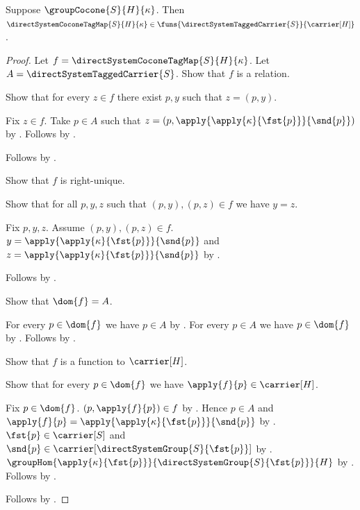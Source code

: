 \begin{theorem}\label{direct_system_cocone_tag_map_type}
    Suppose $\groupCocone{S}{H}{\kappa}$.
    Then $\directSystemCoconeTagMap{S}{H}{\kappa}\in
        \funs{\directSystemTaggedCarrier{S}}{\carrier[H]}$.
\end{theorem}
\begin{proof}
    Let $f=\directSystemCoconeTagMap{S}{H}{\kappa}$.
    Let $A=\directSystemTaggedCarrier{S}$.
    Show that $f$ is a relation.
    \begin{subproof}
        Show that for every $z\in f$ there exist $p,y$ such that
            $z=(p,y)$.
        \begin{subproof}
            Fix $z\in f$.
            Take $p\in A$ such that
                $z=(p,\apply{\apply{\kappa}{\fst{p}}}{\snd{p}})$ by
                .
            Follows by \auto.
        \end{subproof}
        Follows by .
    \end{subproof}
    Show that $f$ is right-unique.
    \begin{subproof}
        Show that for all $p,y,z$ such that $(p,y),(p,z)\in f$
            we have $y=z$.
        \begin{subproof}
            Fix $p,y,z$.
            Assume $(p,y),(p,z)\in f$.
            $y=\apply{\apply{\kappa}{\fst{p}}}{\snd{p}}$ and
                $z=\apply{\apply{\kappa}{\fst{p}}}{\snd{p}}$ by
                .
        \end{subproof}
        Follows by .
    \end{subproof}
    Show that $\dom{f}=A$.
    \begin{subproof}
        For every $p\in\dom{f}$ we have $p\in A$ by
            .
        For every $p\in A$ we have $p\in\dom{f}$ by
            .
        Follows by .
    \end{subproof}
    Show that $f$ is a function to $\carrier[H]$.
    \begin{subproof}
        Show that for every $p\in\dom{f}$ we have
            $\apply{f}{p}\in\carrier[H]$.
        \begin{subproof}
            Fix $p\in\dom{f}$.
            $(p,\apply{f}{p})\in f$ by
                .
            Hence $p\in A$ and
                $\apply{f}{p}=\apply{\apply{\kappa}{\fst{p}}}{\snd{p}}$ by
                .
            $\fst{p}\in\carrier[S]$ and
                $\snd{p}\in\carrier[\directSystemGroup{S}{\fst{p}}]$ by
                .
            $\groupHom
                {\apply{\kappa}{\fst{p}}}
                {\directSystemGroup{S}{\fst{p}}}{H}$ by
                .
            Follows by .
        \end{subproof}
    \end{subproof}
    Follows by .
\end{proof}

